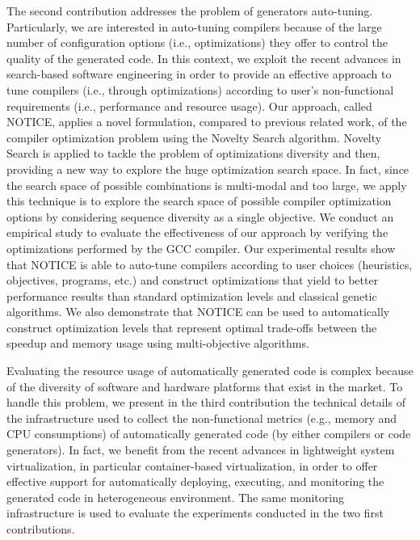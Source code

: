 The second contribution addresses the problem of generators auto-tuning. Particularly, we are interested in auto-tuning compilers because of the large number of configuration options (i.e., optimizations) they offer to control the quality of the generated code. In this context, we exploit the recent advances in search-based software engineering in order to provide an effective approach to tune compilers (i.e., through optimizations) according to user's non-functional requirements (i.e., performance and resource usage). Our approach, called NOTICE, applies a novel formulation, compared to previous related work, of the compiler
optimization problem using the Novelty Search algorithm\cite{lehman2008exploiting}. Novelty Search is applied to tackle the
problem of optimizations diversity and then, providing a new way to explore the huge optimization search space. In fact, since the search
space of possible combinations is multi-modal\cite{bodin1998iterative} and too large, we apply this technique is to explore the search space of possible compiler optimization options by considering sequence diversity as a single objective.
We conduct an empirical study to evaluate the effectiveness of our approach by verifying the optimizations performed by the GCC compiler. Our experimental results show that NOTICE is able to auto-tune compilers according to user choices (heuristics, objectives, programs, etc.) and construct optimizations that yield to better performance results than standard optimization levels and classical genetic algorithms. We also demonstrate that NOTICE can be used to automatically construct optimization levels that represent optimal trade-offs between the speedup and memory usage using multi-objective algorithms.

Evaluating the resource usage of automatically generated code is complex because of the diversity of software and hardware platforms that exist in the market. To handle this problem, we present in the third contribution the technical details of the infrastructure used to collect the non-functional metrics (e.g., memory and CPU consumptions) of automatically generated code (by either compilers or code generators). In fact, we benefit from the recent advances in lightweight system virtualization, in particular container-based virtualization, in order to offer effective support for automatically deploying, executing, and monitoring the generated code in heterogeneous environment.
The same monitoring infrastructure is used to evaluate the experiments conducted in the two first contributions.

